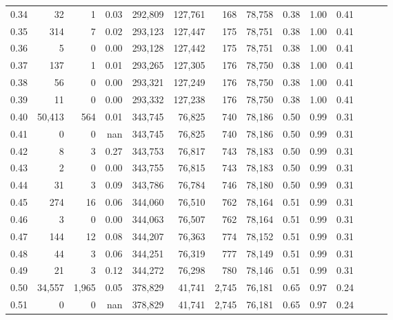 \begin{tabular}{rrrrrrrrrrrrrr}
0.34 &      32 &       1 &  0.03 &  292,809 &  127,761 &     168 &  78,758 &  0.38 &  1.00 &      0.41 \\
0.35 &     314 &       7 &  0.02 &  293,123 &  127,447 &     175 &  78,751 &  0.38 &  1.00 &      0.41 \\
0.36 &       5 &       0 &  0.00 &  293,128 &  127,442 &     175 &  78,751 &  0.38 &  1.00 &      0.41 \\
0.37 &     137 &       1 &  0.01 &  293,265 &  127,305 &     176 &  78,750 &  0.38 &  1.00 &      0.41 \\
0.38 &      56 &       0 &  0.00 &  293,321 &  127,249 &     176 &  78,750 &  0.38 &  1.00 &      0.41 \\
0.39 &      11 &       0 &  0.00 &  293,332 &  127,238 &     176 &  78,750 &  0.38 &  1.00 &      0.41 \\
0.40 &  50,413 &     564 &  0.01 &  343,745 &   76,825 &     740 &  78,186 &  0.50 &  0.99 &      0.31 \\
0.41 &       0 &       0 &   nan &  343,745 &   76,825 &     740 &  78,186 &  0.50 &  0.99 &      0.31 \\
0.42 &       8 &       3 &  0.27 &  343,753 &   76,817 &     743 &  78,183 &  0.50 &  0.99 &      0.31 \\
0.43 &       2 &       0 &  0.00 &  343,755 &   76,815 &     743 &  78,183 &  0.50 &  0.99 &      0.31 \\
0.44 &      31 &       3 &  0.09 &  343,786 &   76,784 &     746 &  78,180 &  0.50 &  0.99 &      0.31 \\
0.45 &     274 &      16 &  0.06 &  344,060 &   76,510 &     762 &  78,164 &  0.51 &  0.99 &      0.31 \\
0.46 &       3 &       0 &  0.00 &  344,063 &   76,507 &     762 &  78,164 &  0.51 &  0.99 &      0.31 \\
0.47 &     144 &      12 &  0.08 &  344,207 &   76,363 &     774 &  78,152 &  0.51 &  0.99 &      0.31 \\
0.48 &      44 &       3 &  0.06 &  344,251 &   76,319 &     777 &  78,149 &  0.51 &  0.99 &      0.31 \\
0.49 &      21 &       3 &  0.12 &  344,272 &   76,298 &     780 &  78,146 &  0.51 &  0.99 &      0.31 \\
0.50 &  34,557 &   1,965 &  0.05 &  378,829 &   41,741 &   2,745 &  76,181 &  0.65 &  0.97 &      0.24 \\
0.51 &       0 &       0 &   nan &  378,829 &   41,741 &   2,745 &  76,181 &  0.65 &  0.97 &      0.24 \\

\end{tabular}
